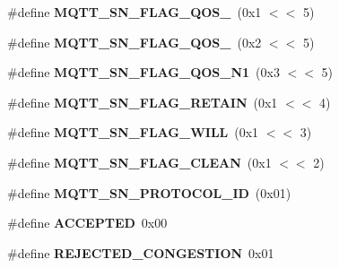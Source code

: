 \begin{DoxyCompactItemize}
\item 
\hypertarget{group__MQTT__SN__CONTROL_ga6d04b90ba54b58e08caa593a84105f21}{\#define {\bfseries M\+Q\+T\+T\+\_\+\+S\+N\+\_\+\+F\+L\+A\+G\+\_\+\+Q\+O\+S\+\_}~(0x1 $<$$<$ 5)}\label{group__MQTT__SN__CONTROL_ga6d04b90ba54b58e08caa593a84105f21}

\item 
\hypertarget{group__MQTT__SN__CONTROL_ga953eaf715ee6055e9f119950be8d7399}{\#define {\bfseries M\+Q\+T\+T\+\_\+\+S\+N\+\_\+\+F\+L\+A\+G\+\_\+\+Q\+O\+S\+\_}~(0x2 $<$$<$ 5)}\label{group__MQTT__SN__CONTROL_ga953eaf715ee6055e9f119950be8d7399}

\item 
\hypertarget{group__MQTT__SN__CONTROL_ga8095eefa31299b606b4ba8bbbcb00195}{\#define {\bfseries M\+Q\+T\+T\+\_\+\+S\+N\+\_\+\+F\+L\+A\+G\+\_\+\+Q\+O\+S\+\_\+\+N1}~(0x3 $<$$<$ 5)}\label{group__MQTT__SN__CONTROL_ga8095eefa31299b606b4ba8bbbcb00195}

\item 
\hypertarget{group__MQTT__SN__CONTROL_ga45271b87fd548295bc4c86c225fc648e}{\#define {\bfseries M\+Q\+T\+T\+\_\+\+S\+N\+\_\+\+F\+L\+A\+G\+\_\+\+R\+E\+T\+A\+I\+N}~(0x1 $<$$<$ 4)}\label{group__MQTT__SN__CONTROL_ga45271b87fd548295bc4c86c225fc648e}

\item 
\hypertarget{group__MQTT__SN__CONTROL_ga8e3f7578e0fef59224e365cef8613f8e}{\#define {\bfseries M\+Q\+T\+T\+\_\+\+S\+N\+\_\+\+F\+L\+A\+G\+\_\+\+W\+I\+L\+L}~(0x1 $<$$<$ 3)}\label{group__MQTT__SN__CONTROL_ga8e3f7578e0fef59224e365cef8613f8e}

\item 
\hypertarget{group__MQTT__SN__CONTROL_ga842ab1c7124c0b63f62ed3283dafbe06}{\#define {\bfseries M\+Q\+T\+T\+\_\+\+S\+N\+\_\+\+F\+L\+A\+G\+\_\+\+C\+L\+E\+A\+N}~(0x1 $<$$<$ 2)}\label{group__MQTT__SN__CONTROL_ga842ab1c7124c0b63f62ed3283dafbe06}

\item 
\hypertarget{group__MQTT__SN__CONTROL_ga0066dd4afeef507b2e8f5ac01f71ea37}{\#define {\bfseries M\+Q\+T\+T\+\_\+\+S\+N\+\_\+\+P\+R\+O\+T\+O\+C\+O\+L\+\_\+\+I\+D}~(0x01)}\label{group__MQTT__SN__CONTROL_ga0066dd4afeef507b2e8f5ac01f71ea37}

\item 
\hypertarget{group__MQTT__SN__CONTROL_ga43005b6b1934800f67a6d169c779c92b}{\#define {\bfseries A\+C\+C\+E\+P\+T\+E\+D}~0x00}\label{group__MQTT__SN__CONTROL_ga43005b6b1934800f67a6d169c779c92b}

\item 
\hypertarget{group__MQTT__SN__CONTROL_ga9b2b214d1ddb0f617efdd26ccc91def4}{\#define {\bfseries R\+E\+J\+E\+C\+T\+E\+D\+\_\+\+C\+O\+N\+G\+E\+S\+T\+I\+O\+N}~0x01}\label{group__MQTT__SN__CONTROL_ga9b2b214d1ddb0f617efdd26ccc91def4}


\end{DoxyCompactItemize}
